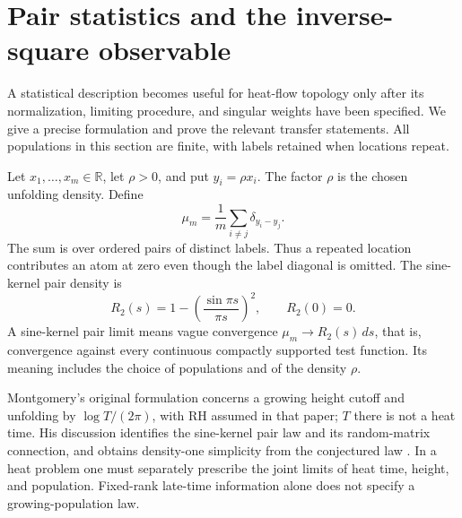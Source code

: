 
\section{Pair statistics and the inverse-square observable}
\label{sc:statistics}

A statistical description becomes useful for heat-flow topology only after
its normalization, limiting procedure, and singular weights have been
specified. We give a precise formulation and prove the relevant transfer
statements. All populations in this section are finite, with labels
retained when locations repeat.

Let $x_1,\ldots,x_m\in\mathbb R$, let $\rho>0$, and put
$y_i=\rho x_i$. The factor $\rho$ is the chosen unfolding density. Define
\begin{equation}
 \mu_m=\frac1m\sum_{i\ne j}\delta_{y_i-y_j}.
 \label{sc:pairmeasure}
\end{equation}
The sum is over ordered pairs of distinct labels. Thus a repeated location
contributes an atom at zero even though the label diagonal is omitted.
The sine-kernel pair density is
\begin{equation}
 R_2(s)=1-\left(\frac{\sin\pi s}{\pi s}\right)^2,
 \qquad R_2(0)=0.
 \label{sc:sine}
\end{equation}
A sine-kernel pair limit means vague convergence
$\mu_m\to R_2(s)\,ds$, that is, convergence against every continuous
compactly supported test function. Its meaning includes the choice of
populations and of the density $\rho$.

Montgomery's original formulation concerns a growing height cutoff and
unfolding by $\log T/(2\pi)$, with RH assumed in that paper; $T$ there is
not a heat time. His discussion identifies the sine-kernel pair law and
its random-matrix connection, and obtains density-one simplicity from
the conjectured law \cite[pp.~181--184]{sc:Montgomery1973}. In a heat
problem one must separately prescribe the joint limits of heat time,
height, and population. Fixed-rank late-time information alone does not
specify a growing-population law.

